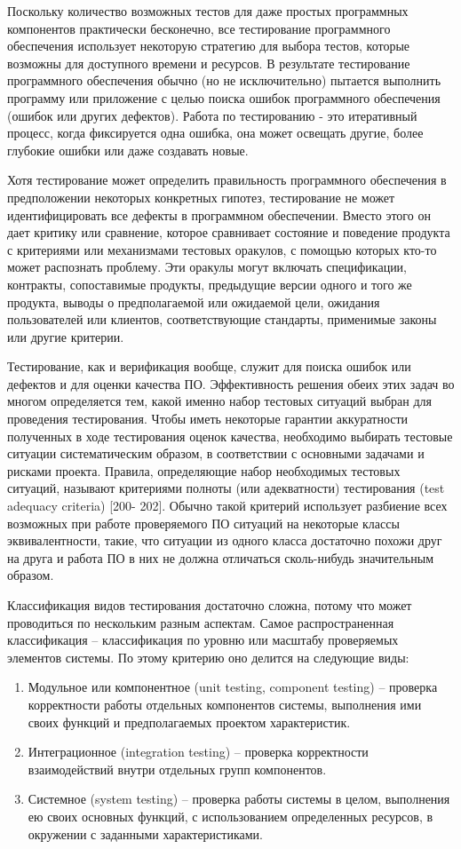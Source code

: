 Поскольку количество возможных тестов для даже простых программных компонентов практически бесконечно, все тестирование программного обеспечения использует некоторую стратегию для выбора тестов, которые возможны для доступного времени и ресурсов. В результате тестирование программного обеспечения обычно (но не исключительно) пытается выполнить программу или приложение с целью поиска ошибок программного обеспечения (ошибок или других дефектов). Работа по тестированию - это итеративный процесс, когда фиксируется одна ошибка, она может освещать другие, более глубокие ошибки или даже создавать новые.

Хотя тестирование может определить правильность программного обеспечения в предположении некоторых конкретных гипотез, тестирование не может идентифицировать все дефекты в программном обеспечении. Вместо этого он дает критику или сравнение, которое сравнивает состояние и поведение продукта с критериями или механизмами тестовых оракулов, с помощью которых кто-то может распознать проблему. Эти оракулы могут включать спецификации, контракты, сопоставимые продукты, предыдущие версии одного и того же продукта, выводы о предполагаемой или ожидаемой цели, ожидания пользователей или клиентов, соответствующие стандарты, применимые законы или другие критерии.


Тестирование, как и верификация вообще, служит для поиска ошибок или дефектов и для оценки качества ПО. Эффективность решения обеих этих задач во многом определяется тем, какой именно набор тестовых ситуаций выбран для проведения тестирования. Чтобы иметь некоторые гарантии аккуратности полученных в ходе тестирования оценок качества, необходимо выбирать тестовые ситуации систематическим образом, в соответствии с основными задачами и рисками проекта. Правила, определяющие набор необходимых тестовых ситуаций, называют критериями полноты (или адекватности) тестирования (test adequacy criteria) [200- 202]. Обычно такой критерий использует разбиение всех возможных при работе проверяемого ПО ситуаций на некоторые классы эквивалентности, такие, что ситуации из одного класса достаточно похожи друг на друга и работа ПО в них не должна отличаться сколь-нибудь значительным образом.

Классификация видов тестирования достаточно сложна, потому что может проводиться по нескольким разным аспектам.  Самое распространенная классификация – классификация по уровню или масштабу проверяемых элементов системы. По этому критерию оно делится на следующие виды:


\begin{enumerate}[label=\arabic*)]
	\item Модульное или компонентное (unit testing, component testing) – проверка корректности работы отдельных компонентов системы, выполнения ими своих функций и предполагаемых проектом характеристик.
	\item Интеграционное (integration testing) – проверка корректности взаимодействий внутри отдельных групп компонентов.
	\item Системное (system testing) – проверка работы системы в целом, выполнения ею своих основных функций, с использованием определенных ресурсов, в окружении с заданными характеристиками.
\end{enumerate}


